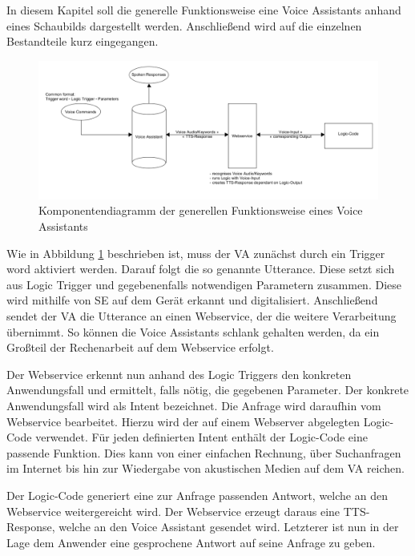 In diesem Kapitel soll die generelle Funktionsweise eine Voice Assistants anhand eines Schaubilds dargestellt werden. Anschließend wird auf die einzelnen Bestandteile kurz eingegangen.

\begin{figure}[htb]
	\centering
	\includegraphics[scale=0.36]{content/img/GeneralVA_Architektur.png}
	\caption{Komponentendiagramm der generellen Funktionsweise eines Voice Assistants}
	\label{imgDiagramm}
\end{figure}

Wie in Abbildung \ref{imgDiagramm} beschrieben ist, muss der VA zunächst durch ein Trigger word aktiviert werden. Darauf folgt die so genannte Utterance. Diese setzt sich aus Logic Trigger und gegebenenfalls notwendigen Parametern zusammen. Diese wird mithilfe von SE auf dem Gerät erkannt und digitalisiert. Anschließend sendet der VA die Utterance an einen Webservice, der die weitere Verarbeitung übernimmt. So können die Voice Assistants schlank gehalten werden, da ein Großteil der Rechenarbeit auf dem Webservice erfolgt. \newline

Der Webservice erkennt nun anhand des Logic Triggers den konkreten Anwendungsfall und ermittelt, falls nötig, die gegebenen Parameter. Der konkrete Anwendungsfall wird als Intent bezeichnet. Die Anfrage wird daraufhin vom Webservice bearbeitet. Hierzu wird der auf einem Webserver abgelegten Logic-Code verwendet. Für jeden definierten Intent enthält der Logic-Code eine passende Funktion. Dies kann von einer einfachen Rechnung, über Suchanfragen im Internet bis hin zur Wiedergabe von akustischen Medien auf dem VA reichen.\newline

Der Logic-Code generiert eine zur Anfrage passenden Antwort, welche an den Webservice weitergereicht wird. Der Webservice erzeugt daraus eine TTS-Response, welche an den Voice Assistant gesendet wird. Letzterer ist nun in der Lage dem Anwender eine gesprochene Antwort auf seine Anfrage zu geben.